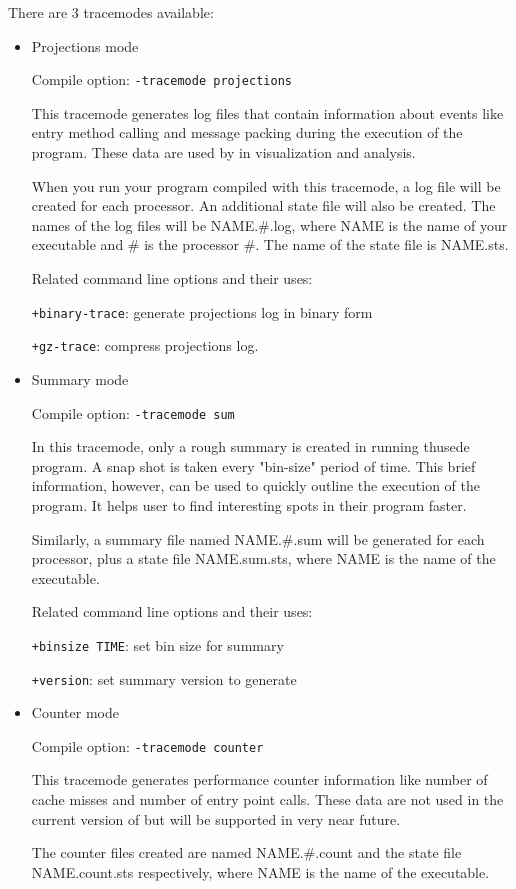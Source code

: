 There are 3 tracemodes available:
\begin{itemize}
\item
Projections mode

Compile option: {\tt -tracemode projections}

This tracemode generates log files that contain information about events like
entry method calling and message packing during the execution of the program.
These data are used by \projections{} in visualization and analysis.

When you run your program compiled with this tracemode, a log file will be
created for each processor.  An additional state file will also be created.  The
names of the log files will be NAME.\#.log, where NAME is the name of your
executable and \# is the processor \#.  The name of the state file is NAME.sts.

Related command line options and their uses:

{\tt +binary-trace}:  generate projections log in binary form

{\tt +gz-trace}:      compress projections log.

\item
Summary mode

Compile option: {\tt -tracemode sum}

In this tracemode, only a rough summary is created in running thusede program.
A snap shot is taken every "bin-size" period of time. This brief information,
however, can be used to quickly outline the execution of the program. It helps
user to find interesting spots in their program faster.

Similarly, a summary file named NAME.\#.sum will be generated for each processor,
plus a state file NAME.sum.sts, where NAME is the name of the executable.

Related command line options and their uses:

{\tt +binsize TIME}:   set bin size for summary

{\tt +version}:        set summary version to generate

\item
Counter mode

Compile option: {\tt -tracemode counter}

This tracemode generates performance counter information like number of cache
misses and number of entry point calls. These data are not used in the current
version of \projections{} but will be supported in very near future.

The counter files created are named NAME.\#.count and the state file NAME.count.sts
respectively, where NAME is the name of the executable.

\end{itemize}

